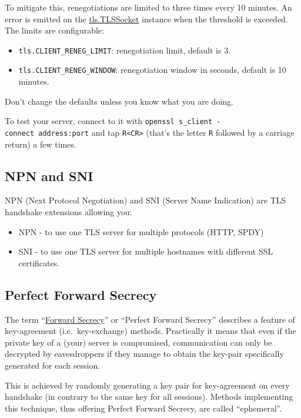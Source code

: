 To mitigate this, renegotiations are limited to three times every 10
minutes. An error is emitted on the
\hyperref[tlsux5fclassux5ftlsux5ftlssocket]{tls.TLSSocket} instance when
the threshold is exceeded. The limits are configurable:

\begin{itemize}
\item
  \texttt{tls.CLIENT\_RENEG\_LIMIT}: renegotiation limit, default is 3.
\item
  \texttt{tls.CLIENT\_RENEG\_WINDOW}: renegotiation window in seconds,
  default is 10 minutes.
\end{itemize}

Don't change the defaults unless you know what you are doing.

To test your server, connect to it with
\texttt{openssl\ s\_client\ -connect\ address:port} and tap
\texttt{R\textless{}CR\textgreater{}} (that's the letter \texttt{R}
followed by a carriage return) a few times.

\subsection{NPN and SNI}\label{npn-and-sni}

NPN (Next Protocol Negotiation) and SNI (Server Name Indication) are TLS
handshake extensions allowing you:

\begin{itemize}
\itemsep1pt\parskip0pt
\item
  NPN - to use one TLS server for multiple protocols (HTTP, SPDY)
\item
  SNI - to use one TLS server for multiple hostnames with different SSL
  certificates.
\end{itemize}

\subsection{Perfect Forward Secrecy}\label{perfect-forward-secrecy}

The term
``\href{http://en.wikipedia.org/wiki/Perfect_forward_secrecy}{Forward
Secrecy}'' or ``Perfect Forward Secrecy'' describes a feature of
key-agreement (i.e.~key-exchange) methods. Practically it means that
even if the private key of a (your) server is compromised, communication
can only be decrypted by eavesdroppers if they manage to obtain the
key-pair specifically generated for each session.

This is achieved by randomly generating a key pair for key-agreement on
every handshake (in contrary to the same key for all sessions). Methods
implementing this technique, thus offering Perfect Forward Secrecy, are
called ``ephemeral''.

